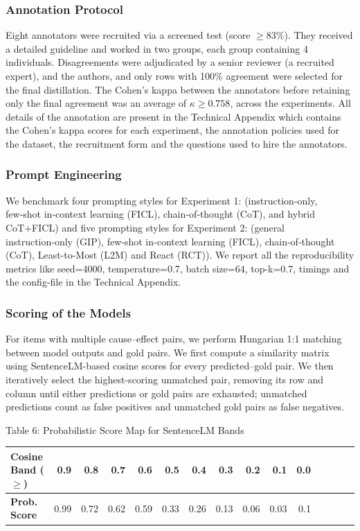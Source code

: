 \documentclass[conference]{IEEEtran}
\newcommand{\sun}[1]{\textcolor{blue}{[SC: #1]}}
\begin{document}
\subsubsection{Annotation Protocol}
Eight annotators were recruited via a screened test   (score $\ge83\%$).  
They received a detailed guideline and worked in two groups, each group containing 4 individuals. Disagreements were adjudicated by a senior reviewer (a recruited expert), and the authors, and only rows with 100\% agreement were selected for the final distillation. The Cohen's kappa between the annotators before retaining only the final agreement was an average of $\kappa \ge 0.758$, across the experiments.  All details of the annotation are present in the Technical Appendix which contains the Cohen's kappa scores for each experiment, the annotation policies used for the dataset, the recruitment form and the questions used to hire the annotators.

\subsubsection{Prompt Engineering}
We benchmark four prompting styles for Experiment 1: (instruction‑only, few‑shot in‑context learning (FICL), chain‑of‑thought (CoT), and hybrid CoT+FICL) and five prompting styles for Experiment 2: (general instruction‑only (GIP), few‑shot in‑context learning (FICL), chain‑of‑thought (CoT), Least-to-Most (L2M) and React (RCT)). We report all the reproducibility metrics like seed=4000, temperature=0.7, batch size=64, top-k=0.7, timings and the config-file in the Technical Appendix.

\subsubsection{Scoring of the Models}
For items with multiple cause–effect pairs, we perform Hungarian 1:1 matching between model outputs and gold pairs. We first compute a similarity matrix using SentenceLM-based cosine scores for every predicted–gold pair. We then iteratively select the highest-scoring unmatched pair, removing its row and column until either predictions or gold pairs are exhausted; unmatched predictions count as false positives and unmatched gold pairs as false negatives.

\begin{table}[ht]
\centering
\scriptsize
  \setlength{\tabcolsep}{3pt}
  Table 6: {Probabilistic Score Map for SentenceLM Bands}
\label{tab:score_map}
\begin{tabular}{l*{14}{r}}
\toprule
\textbf{Cosine Band} ($\ge$) & 0.9 & 0.8 & 0.7 & 0.6 & 0.5 & 0.4 & 0.3 & 0.2 & 0.1 & 0.0 \\
\midrule
\textbf{Prob. Score} & 0.99 & 0.72 & 0.62 & 0.59 & 0.33 & 0.26 & 0.13 & 0.06 & 0.03 & 0.1 \\
\bottomrule
\end{tabular}
\end{table}
\end{document}

